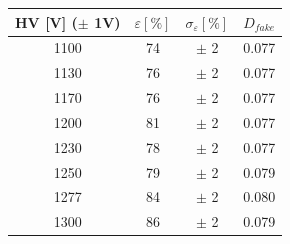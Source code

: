 \begin{tabular}{cccc}
    \toprule
    HV [V] ($\pm$ 1V) & $\varepsilon [\%]$ & $\sigma_{\varepsilon} [\%]$ & $D_{fake}$ \\
    \midrule
    1100 & 74 & $\pm$ 2 & 0.077 \\
    1130 & 76 & $\pm$ 2 & 0.077 \\
    1170 & 76 & $\pm$ 2 & 0.077 \\
    1200 & 81 & $\pm$ 2 & 0.077 \\
    1230 & 78 & $\pm$ 2 & 0.077 \\
    1250 & 79 & $\pm$ 2 & 0.079 \\
    1277 & 84 & $\pm$ 2 & 0.080 \\
    1300 & 86 & $\pm$ 2 & 0.079 \\
    \bottomrule
\end{tabular}